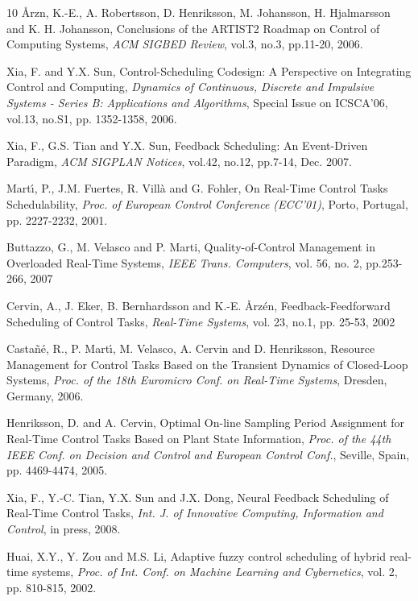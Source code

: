 \documentclass[12pt,a4paper]{ijicic}
\begin{document}
\begin {thebibliography}{10}
{\AA}rzn, K.-E., A. Robertsson, D. Henriksson, M.
Johansson, H. Hjalmarsson and K. H. Johansson, Conclusions of the
ARTIST2 Roadmap on Control of Computing Systems, \emph{ACM SIGBED
Review}, vol.3, no.3, pp.11-20, 2006.

Xia, F. and Y.X. Sun, Control-Scheduling Codesign: A Perspective on
Integrating Control and Computing, \emph{Dynamics of Continuous,
Discrete and Impulsive Systems - Series B: Applications and
Algorithms}, Special Issue on ICSCA'06, vol.13, no.S1, pp.
1352-1358, 2006.

Xia, F., G.S. Tian and Y.X. Sun, Feedback Scheduling: An
Event-Driven Paradigm, \emph{ACM SIGPLAN Notices}, vol.42, no.12,
pp.7-14, Dec. 2007.

Mart\'{\i}, P., J.M. Fuertes, R. Vill\`{a} and G. Fohler, On
Real-Time Control Tasks Schedulability, \emph{Proc. of European
Control Conference (ECC'01)}, Porto, Portugal, pp. 2227-2232, 2001.

Buttazzo, G., M. Velasco and P. Marti, Quality-of-Control Management
in Overloaded Real-Time Systems, \emph{IEEE Trans. Computers}, vol.
56, no. 2, pp.253-266, 2007

Cervin, A., J. Eker, B. Bernhardsson and K.-E. {\AA}rz\'{e}n,
Feedback-Feedforward Scheduling of Control Tasks, \emph{Real-Time
Systems}, vol. 23, no.1, pp. 25-53, 2002

Casta\~{n}\'{e}, R., P. Mart\'{\i}, M. Velasco, A. Cervin and D.
Henriksson, Resource Management for Control Tasks Based on the
Transient Dynamics of Closed-Loop Systems, \emph{Proc. of the 18th
Euromicro Conf. on Real-Time Systems}, Dresden, Germany, 2006.

Henriksson, D. and A. Cervin, Optimal On-line Sampling Period
Assignment for Real-Time Control Tasks Based on Plant State
Information, \emph{Proc. of the 44th IEEE Conf. on Decision and
Control and European Control Conf.}, Seville, Spain, pp. 4469-4474,
2005.

Xia, F., Y.-C. Tian, Y.X. Sun and J.X. Dong, Neural Feedback
Scheduling of Real-Time Control Tasks, \emph{Int. J. of Innovative
Computing, Information and Control}, in press, 2008.

Huai, X.Y., Y. Zou and M.S. Li, Adaptive fuzzy control scheduling of
hybrid real-time systems, \emph{Proc. of Int. Conf. on Machine
Learning and Cybernetics}, vol. 2, pp. 810-815, 2002.


\end{thebibliography}
\end{document}
